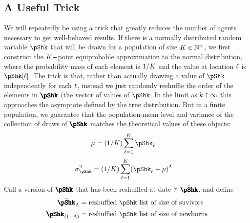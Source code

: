 \documentclass[../BufferStockTheory.tex]{subfiles}\usepackage{ApndxSteadyState}
\begin{document}
  \subsection{A Useful Trick}
  We will repeatedly be using a trick that greatly reduces the number of agents necessary to get well-behaved results.  If there is a normally distributed random variable $\pShk$ that will be drawn for a population of size $K \in \mathbb{N}^{+}$, we first construct the $K-$point equiprobable approximation to the normal distribution, where the probability mass of each element is $1/K$ and the value at location $\ell$ is $\pShk[\posn]$.
  The trick is that, rather than actually drawing a value of $\pShk$ independently for each $\ell$, instead we just randomly reshuffle the order of the elements in $\vctr{\pShk}$ (the vector of values of $\pShk$.  In the limit as $k \uparrow \infty$ this approaches the asymptote defined by the true distribution.  But in a finite population, we guarantee that the population-mean level and variance of the collection of draws of $\vctr{\pShk}$ matches the theoretical values of these objects:
  \begin{align}
    \mu & = (1/\Mass)\sum_{\posn=1}^{\Mass}\pShk_{\posn}
  \end{align}
  \begin{align}
    \sigma^{2}_{\pShk} & = (1/\Mass)\sum_{\posn=1}^{\Mass}(\pShk_{\posn} - \mu)^{2}
  \end{align}
  Call a version of $\vctr{\pShk}$ that has been reshuffled at date $\tau$ $\tilde{\vctr{\pShk}}$, and define
  \newcommand{\pShkOldRemix}{\tilde{\vctr{\pShk}}_{\Liv}}
  \newcommand{\pShkNewRemix}{\tilde{\vctr{\pShk}}_{\Die}}
  \begin{align}
    \pShkOldRemix & = \text{reshuffled $\pShk$ list of size of suvivors} 
    \\  \pShkNewRemix & = \text{reshuffled $\pShk$ list of size of newborns}
  \end{align}
\end{document}
